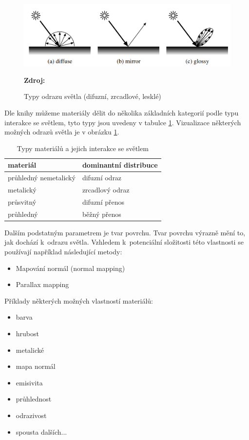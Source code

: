 \begin{figure}[H]
	\centering
	\includegraphics[scale=1]{obrazky-figures/reflection_types.png}
	\caption{Typy odrazu světla (difuzní, zrcadlové, lesklé)}
	\textbf{Zdroj: \cite{materials}}
	\label{fig:refl_types}
\end{figure}

Dle knihy \cite{hunter_harold_1987} můžeme materiály dělit do několika základních kategorií podle typu interakce se světlem, tyto typy jsou uvedeny v tabulce \ref{tab:mats_distr}. Vizualizace některých možných odrazů světla je v obrázku \ref{fig:refl_types}.

\begin{table}[H]
	\centering
	\begin{tabular}{|l|l|}
		\hline
		materiál              & dominantní distribuce \\ \hline
		průhledný nemetalický & difuzní odraz         \\ \hline
		metalický             & zrcadlový odraz       \\ \hline
		průsvitný             & difuzní přenos        \\ \hline
		průhledný             & běžný přenos          \\ \hline
	\end{tabular}
	\caption{Typy materiálů a jejich interakce se světlem}
	\label{tab:mats_distr}
\end{table}


Dalším podstatným parametrem je tvar povrchu. Tvar povrchu výrazně mění to, jak dochází k~odrazu světla. Vzhledem k~potenciální složitosti této vlastnosti se používají například následující metody:

\begin{itemize}
	\item Mapování normál (normal mapping)
	\item Parallax mapping
\end{itemize}

Příklady některých možných vlastností materiálů:

\begin{itemize}
	\item barva
	\item hrubost
	\item metalické
	\item mapa normál
	\item emisivita
	\item průhlednost
	\item odrazivost
	\item spousta dalších...
\end{itemize}


